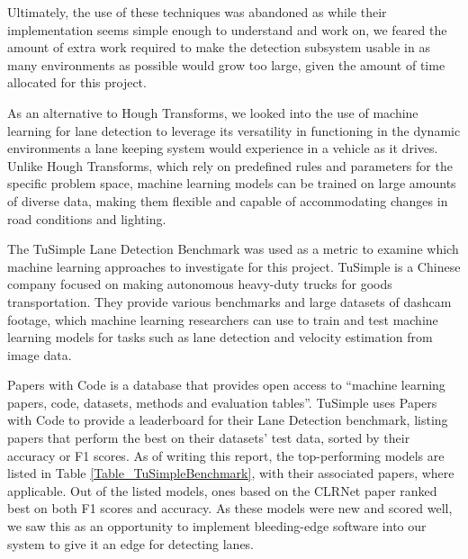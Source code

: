 \documentclass[titlepage, draft]{article}
\begin{document}
Ultimately, the use of these techniques was abandoned as while their implementation seems simple enough to understand and work
on, we feared the amount of extra work required to make the detection subsystem usable in as many environments as possible
would grow too large, given the amount of time allocated for this project.

As an alternative to Hough Transforms, we looked into the use of machine learning for lane detection to leverage its versatility
in functioning in the dynamic environments a lane keeping system would experience in a vehicle as it drives.
Unlike Hough Transforms, which rely on predefined rules and parameters for the specific problem space, machine learning models
can be trained on large amounts of diverse data, making them flexible and capable of accommodating changes in road conditions
and lighting.

The TuSimple Lane Detection Benchmark\cite{TuSimpleBenchmark} was used as a metric to examine which machine learning approaches
to investigate for this project.
TuSimple is a Chinese company focused on making autonomous heavy-duty trucks for goods transportation.
They provide various benchmarks and large datasets of dashcam footage, which machine learning researchers can use to train and
test machine learning models for tasks such as lane detection and velocity estimation from image data. \cite{TuSimpleBenchmark}

Papers with Code is a database that provides open access to ``machine learning papers, code, datasets, methods and evaluation
tables''. \cite{PapersWithCode}
TuSimple uses Papers with Code to provide a leaderboard for their Lane Detection benchmark, listing papers that perform the best
on their datasets' test data, sorted by their accuracy or F1 scores.
As of writing this report, the top-performing models are listed in Table \ref{Table_TuSimpleBenchmark}, with their associated
papers, where applicable.
Out of the listed models, ones based on the CLRNet paper ranked best on both F1 scores and accuracy.
As these models were new and scored well, we saw this as an opportunity to implement bleeding-edge software into our system
to give it an edge for detecting lanes.
\end{document}

